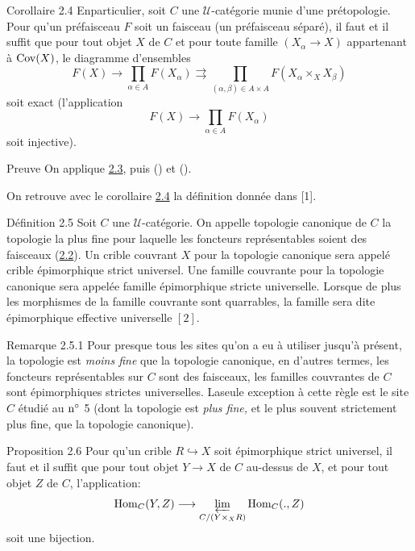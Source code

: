 \documentclass[10pt]{../fichiers-configuration-latex/smfart}
\begin{document}
\begin{enonce*}{Corollaire 2.4}
En\pageoriginale particulier, soit $C$ une $𝒰$-catégorie
munie d'une prétopologie. Pour qu'un préfaisceau $F$ soit un
faisceau (\resp un préfaisceau séparé), il faut et il suffit
que pour tout objet $X$ de $C$ et pour toute famille
$(X_{\alpha}\rightarrow X)$ appartenant à $\operatorname{Cov}(X)$, le diagramme
d'ensembles
$$
F(X)\rightarrow \prod_{\alpha\in A}F(X_{\alpha})\rightrightarrows
\prod_{(\alpha,\beta)\in A\times A}F(X_{\alpha}\times_X X_{\beta})
$$
soit exact (\resp l'application
$$
F(X)\longrightarrow \prod_{\alpha\in A}F(X_{\alpha})
$$
soit injective).
\end{enonce*}

\begin{enonce*}[remark]{Preuve}
On applique \hyperref[II.cor2.3]{2.3}, puis () et
().

On retrouve avec le corollaire \hyperref[II.cor2.4]{2.4} la définition
donnée dans [1].
\end{enonce*}

\begin{enonce*}{Définition 2.5}
Soit $C$ une $𝒰$-catégorie. On appelle topologie canonique
de $C$ la topologie la plus fine pour laquelle les foncteurs
représentables soient des faisceaux (\hyperref[II.prop2.2]{2.2}). Un crible
couvrant $X$ pour la topologie canonique sera appelé crible
épimorphique strict universel. Une famille couvrante pour la
topologie canonique sera appelée famille épimorphique stricte
universelle. Lorsque de plus les morphismes de la famille couvrante
sont quarrables, la famille sera dite épimorphique effective
universelle $[2]$.
\end{enonce*}

\begin{enonce*}[remark]{Remarque 2.5.1}
Pour presque tous les sites qu'on a eu à utiliser jusqu'à présent,
la topologie est \emph{moins fine} que la topologie canonique, en
d'autres termes, les foncteurs représentables sur $C$ sont des
faisceaux, \ie les familles couvrantes de $C$ sont épimorphiques
strictes universelles. La\pageoriginale seule exception à cette
règle est le site $\widehat{C}$ étudié au ${\rm n^{\circ}}$ 5
(dont la topologie est \emph{plus fine,} et le plus souvent
strictement plus fine, que la topologie canonique).
\end{enonce*}

\begin{enonce*}{Proposition 2.6}
Pour qu'un crible $R\hookrightarrow X$ soit épimorphique strict
universel, il faut et il suffit que pour tout objet $Y\rightarrow X$
de $C$ au-dessus de $X$, et pour tout objet $Z$ de $C$,
l'application:
$$
\operatorname{Hom}_C(Y,Z)\longrightarrow \varprojlim_{C/(Y\times_X R)}\operatorname{Hom}_C (.,
Z)
$$
soit une bijection.
\end{enonce*}
\end{document}
